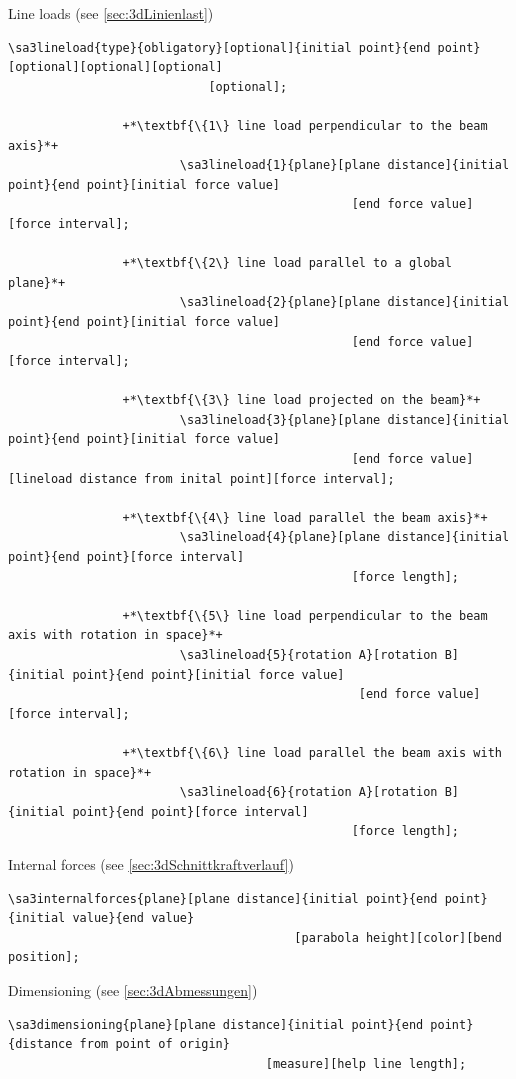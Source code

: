 \documentclass[%
  a4paper,
  BCOR=20mm,
  numbers=noenddot,
  twoside,
  parskip=half,
  openright,
  version=last,
]{scrreprt}
\begin{document}
Line loads (see \ref{sec:3dLinienlast})

\begin{lstlisting}[emph={dlineload},backgroundcolor=\color{white}]
		\sa3lineload{type}{obligatory}[optional]{initial point}{end point}[optional][optional][optional]
							[optional];
		
				+*\textbf{\{1\} line load perpendicular to the beam axis}*+
						\sa3lineload{1}{plane}[plane distance]{initial point}{end point}[initial force value]
												[end force value][force interval];
						
				+*\textbf{\{2\} line load parallel to a global plane}*+
						\sa3lineload{2}{plane}[plane distance]{initial point}{end point}[initial force value]
												[end force value][force interval];
						
				+*\textbf{\{3\} line load projected on the beam}*+
						\sa3lineload{3}{plane}[plane distance]{initial point}{end point}[initial force value]
												[end force value][lineload distance from inital point][force interval];
						
				+*\textbf{\{4\} line load parallel the beam axis}*+
						\sa3lineload{4}{plane}[plane distance]{initial point}{end point}[force interval]
												[force length];
						
				+*\textbf{\{5\} line load perpendicular to the beam axis with rotation in space}*+
						\sa3lineload{5}{rotation A}[rotation B]{initial point}{end point}[initial force value]
												 [end force value][force interval];
						
				+*\textbf{\{6\} line load parallel the beam axis with rotation in space}*+
						\sa3lineload{6}{rotation A}[rotation B]{initial point}{end point}[force interval]
												[force length];
\end{lstlisting}\vspace{-10mm}

Internal forces (see \ref{sec:3dSchnittkraftverlauf})

\begin{lstlisting}[emph={dinternalforces},backgroundcolor=\color{white}]
		\sa3internalforces{plane}[plane distance]{initial point}{end point}{initial value}{end value}
										[parabola height][color][bend position];
\end{lstlisting}\vspace{-10mm}

Dimensioning (see \ref{sec:3dAbmessungen})

\begin{lstlisting}[emph={ddimensioning},backgroundcolor=\color{white}]
		\sa3dimensioning{plane}[plane distance]{initial point}{end point}{distance from point of origin}
									[measure][help line length];
\end{lstlisting}\vspace{-10mm}
\end{document}
